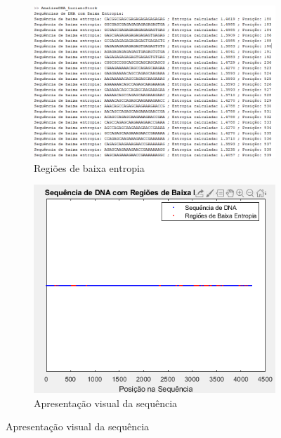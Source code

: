\documentclass{article}
\begin{document}
\begin{figure}[h]
  \centering
  \begin{subfigure}{0.5\textwidth}
    \centering
    \includegraphics[width=\linewidth]{Cod1.png}
    \caption{\label{fig:hexo1.jpeg}Regiões de baixa entropia}
  \end{subfigure}\hspace{8em}
  \begin{subfigure}{0.5\textwidth}
    \centering
    \includegraphics[width=\linewidth]{Cod2.png}
    \caption{Apresentação visual da sequência}
  \end{subfigure}
  \end{figure}
  
\end{document}
